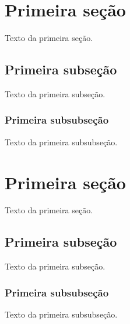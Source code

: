 \documentclass[a4paper,12pt,oneside,onecolumn,final,fleqn]{repUERJ}
\begin{document}
\annex %


\section{Primeira seção}

Texto da primeira seção.

\subsection{Primeira subseção}

Texto da primeira subseção.

\subsubsection{Primeira subsubseção}

Texto da primeira subsubseção.


\section{Primeira seção}

Texto da primeira seção.

\subsection{Primeira subseção}

Texto da primeira subseção.

\subsubsection{Primeira subsubseção}

Texto da primeira subsubseção.

\end{document}
